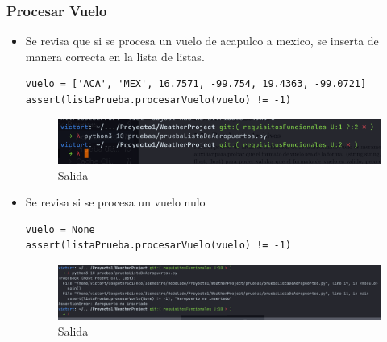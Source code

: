 \documentclass[12pt]{article}
\begin{document}
\subsubsection{Procesar Vuelo}
\begin{itemize}
\item Se revisa que si se procesa un vuelo de acapulco a mexico, se inserta de manera correcta en la lista de listas.
\begin{verbatim}
vuelo = ['ACA', 'MEX', 16.7571, -99.754, 19.4363, -99.0721]
assert(listaPrueba.procesarVuelo(vuelo) != -1)    
\end{verbatim}
\begin{figure}[h!]
    \centering
    \includegraphics[scale=0.7]{pruebasPy/listaAeropuertos/bien.png}
    \caption{Salida}
  \end{figure}
\item Se revisa si se procesa un vuelo nulo
\begin{verbatim}
vuelo = None
assert(listaPrueba.procesarVuelo(vuelo) != -1)    
\end{verbatim}

\begin{figure}[h!]
    \centering
    \includegraphics[scale=0.3]{pruebasPy/listaAeropuertos/procesaNone.png}
    \caption{Salida}
  \end{figure}
\end{itemize}
\end{document}
